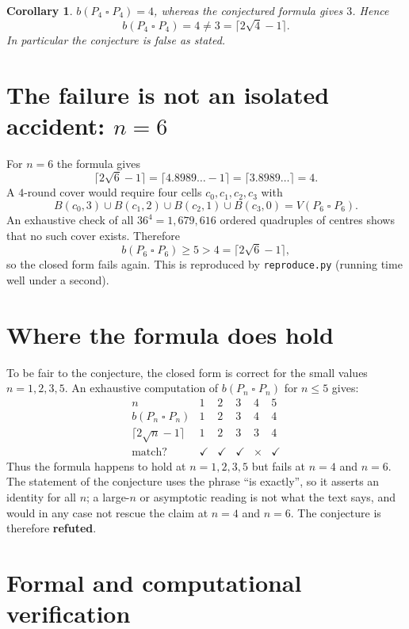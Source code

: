 \documentclass[11pt]{article}
\newtheorem{corollary}[theorem]{Corollary}
\theoremstyle{definition}
\theoremstyle{remark}
\begin{document}
\begin{corollary}
$b(P_4 \mathbin{\square} P_4) = 4$, whereas the conjectured formula gives $3$.
Hence
\[
  b(P_4 \mathbin{\square} P_4) = 4 \neq 3 = \bigl\lceil 2\sqrt{4}-1\bigr\rceil .
\]
In particular the conjecture is false as stated.
\end{corollary}

\section{The failure is not an isolated accident: $n=6$}

For $n = 6$ the formula gives
\[
  \bigl\lceil 2\sqrt{6}-1 \bigr\rceil = \lceil 4.8989\ldots-1\rceil
  = \lceil 3.8989\ldots \rceil = 4 .
\]
A $4$-round cover would require four cells $c_0,c_1,c_2,c_3$ with
\[
  B(c_0,3)\cup B(c_1,2)\cup B(c_2,1)\cup B(c_3,0) = V(P_6 \mathbin{\square} P_6).
\]
An exhaustive check of all $36^4 = 1{,}679{,}616$ ordered quadruples of
centres shows that no such cover exists.  Therefore
\[
  b(P_6 \mathbin{\square} P_6) \ge 5 > 4 = \bigl\lceil 2\sqrt{6}-1\bigr\rceil,
\]
so the closed form fails again.  This is reproduced by \texttt{reproduce.py}
(running time well under a second).

\section{Where the formula does hold}

To be fair to the conjecture, the closed form is correct for the small values
$n = 1,2,3,5$.  An exhaustive computation of $b(P_n \mathbin{\square} P_n)$
for $n \le 5$ gives:
\[
\begin{array}{c|ccccc}
  n & 1 & 2 & 3 & 4 & 5\\ \hline
  b(P_n \mathbin{\square} P_n) & 1 & 2 & 3 & 4 & 4\\
  \lceil 2\sqrt{n}-1\rceil & 1 & 2 & 3 & 3 & 4\\
  \text{match?} & \checkmark & \checkmark & \checkmark & \times & \checkmark
\end{array}
\]
Thus the formula happens to hold at $n=1,2,3,5$ but fails at $n=4$ and $n=6$.
The statement of the conjecture uses the phrase ``is exactly'', so it asserts
an identity for all $n$; a large-$n$ or asymptotic reading is not what the text
says, and would in any case not rescue the claim at $n=4$ and $n=6$.  The
conjecture is therefore \textbf{refuted}.

\section{Formal and computational verification}
\end{document}
